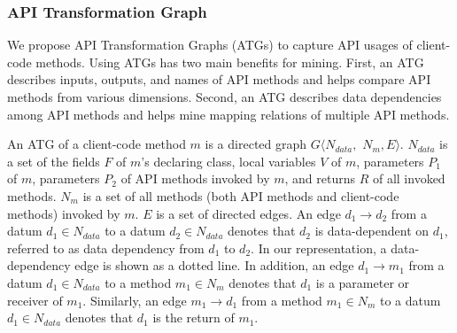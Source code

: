 \subsubsection{API Transformation Graph}
\label{sec:approach:mappingmethods:graph}
We propose API Transformation Graphs (ATGs) to capture API usages of client-code methods. Using ATGs has two main benefits for mining. First, an ATG describes inputs, outputs, and names of API methods and helps compare API methods from various dimensions. Second, an ATG describes data dependencies among API methods and helps mine mapping relations of multiple API methods.

An ATG of a client-code method $m$ is a directed graph $G\langle N_{data},$ $ N_m, E\rangle$.
$N_{data}$ is a set of the fields $F$ of $m$'s declaring class, local variables $V$ of
$m$, parameters $P_1$ of $m$, parameters $P_2$ of API methods invoked
by $m$, and returns $R$ of all invoked methods. $N_{m}$ is a set of 
all methods (both API methods and client-code methods) invoked by $m$. $E$ is a set of directed edges. An edge
$d_1\rightarrow d_2$ from a datum $d_1 \in N_{data}$ to a datum $d_2
\in N_{data}$ denotes that $d_2$ is data-dependent on $d_1$, referred to as
data dependency from $d_1$ to $d_2$. In our representation, a data-dependency
edge is shown as a dotted line. In addition, 
an edge $d_1 \rightarrow m_1$ from a datum $d_1 \in N_{data}$ to a
method $ m_1 \in N_{m}$ denotes that $d_1$ is a parameter or receiver
of $m_1$. Similarly, an edge $m_1 \rightarrow d_1$ from a method $m_1
\in N_{m}$ to a datum $d_1 \in N_{data}$ denotes that $d_1$ is the return
of $m_1$.

%
%
%

